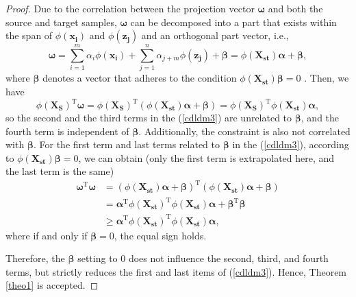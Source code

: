 \documentclass[a4paper]{cas-sc}
\begin{document}
\begin{proof}
Due to the correlation between the projection vector $\boldsymbol{\omega}$ and both the source and target samples, $\boldsymbol{\omega}$ can be decomposed into a part that exists within the span of $\phi(\boldsymbol{x_i})$ and $\phi(\boldsymbol{z_j})$ and an orthogonal part vector, i.e.,
\begin{equation}
\boldsymbol{\omega}  = \sum_{i=1}^m \alpha_i \phi(\boldsymbol{x_i}) + \sum_{j=1}^n \alpha_{j+m} \phi(\boldsymbol{z_j}) + \boldsymbol{\beta}= \phi(\boldsymbol{X_{st}})\boldsymbol{\alpha} +\boldsymbol{\beta},
\end{equation}
where $\boldsymbol{\beta}$ denotes a vector  that adheres to the condition $\phi(\boldsymbol{X_{st}})\boldsymbol{\beta} = 0$ \cite{zhang2014large}. Then, we have
\begin{equation}
\phi(\boldsymbol{X_S})^\mathrm{T} \boldsymbol{\omega} = \phi(\boldsymbol{X_S})^\mathrm{T} (\phi(\boldsymbol{X_{st}})\boldsymbol{\alpha} +\boldsymbol{\beta}) = \phi(\boldsymbol{X_S})^\mathrm{T} \phi(\boldsymbol{X_{st}}) \boldsymbol{\alpha},
\end{equation}
so the second and the third terms in the (\ref{cdldm3}) are unrelated to $\boldsymbol{\beta}$, and the fourth term is independent of $\boldsymbol{\beta}$. Additionally, the constraint is also not correlated with $\boldsymbol{\beta}$. For the first term and last terms related to $\boldsymbol{\beta}$ in the (\ref{cdldm3}), according to $\phi(\boldsymbol{X_{st}})\boldsymbol{\beta} = 0$, we can obtain (only the first term is extrapolated here, and the last term is the same)
\begin{equation}
\begin{aligned}
\boldsymbol{\omega}^\mathrm{T} \boldsymbol{\omega} & = (\phi(\boldsymbol{X_{st}})\boldsymbol{\alpha} +\boldsymbol{\beta})^\mathrm{T} (\phi(\boldsymbol{X_{st}})\boldsymbol{\alpha} +\boldsymbol{\beta})\\
& = \boldsymbol{\alpha}^\mathrm{T} \phi(\boldsymbol{X_{st}})^\mathrm{T} \phi(\boldsymbol{X_{st}}) \boldsymbol{\alpha} + \boldsymbol{\beta}^\mathrm{T} \boldsymbol{\beta}\\
& \geq \boldsymbol{\alpha}^\mathrm{T} \phi(\boldsymbol{X_{st}})^\mathrm{T} \phi(\boldsymbol{X_{st}}) \boldsymbol{\alpha},
\end{aligned}
\end{equation}
where if and only if $\boldsymbol{\beta} = 0$, the equal sign holds.

Therefore, the $\boldsymbol{\beta}$ setting to 0 does not influence the second, third, and fourth terms, but strictly reduces the first and last items of (\ref{cdldm3}). Hence, Theorem \ref{theo1} is accepted.
\end{proof}
\end{document}
